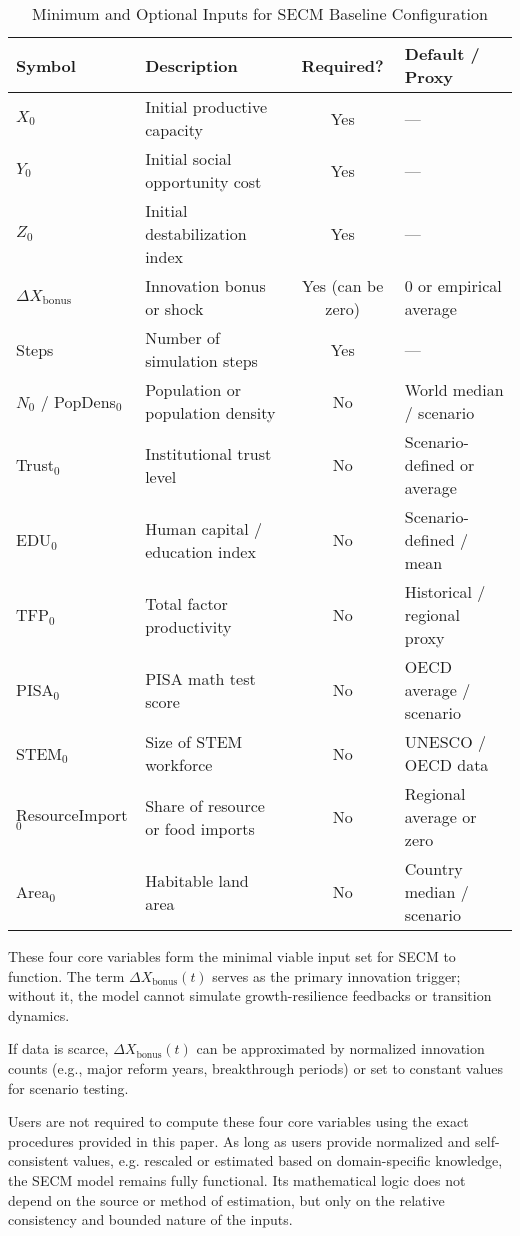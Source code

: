 \documentclass[12pt]{report}
\begin{document}
\begin{table}[h!]
\centering
\small
\caption{Minimum and Optional Inputs for SECM Baseline Configuration}
\label{tab:ParamRanges}
\begin{tabular}{|l|p{6.5cm}|c|p{4.2cm}|}
\hline
\textbf{Symbol} & \textbf{Description} & \textbf{Required?} & \textbf{Default / Proxy} \\
\hline
$X_0$ & Initial productive capacity & Yes & --- \\
$Y_0$ & Initial social opportunity cost & Yes & --- \\
$Z_0$ & Initial destabilization index & Yes & --- \\
$\Delta X_{\text{bonus}}$ & Innovation bonus or shock & Yes (can be zero) & 0 or empirical average \\
Steps & Number of simulation steps & Yes & --- \\
$N_0$ / PopDens$_0$ & Population or population density & No & World median / scenario \\
Trust$_0$ & Institutional trust level & No & Scenario-defined or average \\
EDU$_0$ & Human capital / education index & No & Scenario-defined / mean \\
TFP$_0$ & Total factor productivity & No & Historical / regional proxy \\
PISA$_0$ & PISA math test score & No & OECD average / scenario \\
STEM$_0$ & Size of STEM workforce & No & UNESCO / OECD data \\
ResourceImport$_0$ & Share of resource or food imports & No & Regional average or zero \\
Area$_0$ & Habitable land area & No & Country median / scenario \\
\hline
\end{tabular}
\end{table}




These four core variables form the minimal viable input set for SECM to function. The term $\Delta X_{\text{bonus}}(t)$ serves as the primary innovation trigger; without it, the model cannot simulate growth-resilience feedbacks or transition dynamics.

If data is scarce, $\Delta X_{\text{bonus}}(t)$ can be approximated by normalized innovation counts (e.g., major reform years, breakthrough periods) or set to constant values for scenario testing.

Users are not required to compute these four core variables using the exact procedures provided in this paper. As long as users provide normalized and self-consistent values, e.g. rescaled or estimated based on domain-specific knowledge, the SECM model remains fully functional. Its mathematical logic does not depend on the source or method of estimation, but only on the relative consistency and bounded nature of the inputs.
\end{document}
